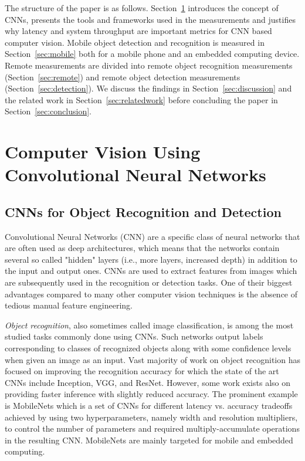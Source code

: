 \documentclass[sigconf]{acmart}
\begin{document}
The structure of the paper is as follows. Section~\ref{sec:background} introduces the concept of CNNs, presents the tools and frameworks used in the measurements and justifies why latency and system throughput are important metrics for CNN based computer vision. Mobile object detection and recognition is measured in Section~\ref{sec:mobile} both for a mobile phone and an embedded computing device. Remote measurements are divided into remote object recognition measurements (Section~\ref{sec:remote}) and remote object detection measurements (Section~\ref{sec:detection}). We discuss the findings in Section~\ref{sec:discussion} and the related work in Section~\ref{sec:relatedwork} before concluding the paper in Section~\ref{sec:conclusion}. %

\section{Computer Vision Using Convolutional Neural Networks}\label{sec:background}\subsection{CNNs for Object Recognition and Detection}

Convolutional Neural Networks (CNN) are a specific class of neural networks that are often used as deep architectures, which means that the networks contain several so called "hidden" layers (i.e., more layers, increased depth) in addition to the input and output ones. 
CNNs are used to extract features from images which are subsequently used in the recognition or detection tasks. One of their biggest advantages compared to many other computer vision techniques is the absence of tedious manual feature engineering.

\textit{Object recognition}, also sometimes called image classification, is among the most studied tasks commonly done using CNNs. Such networks output labels corresponding to classes of recognized objects along with some confidence levels when given an image as an input. Vast majority of work on object recognition has focused on improving the recognition accuracy for which the state of the art CNNs include Inception\cite{Szegedy_2015_CVPR,pmlr-v37-ioffe15,Szegedy_2016_CVPR}, VGG, and ResNet. However, some work exists also on providing faster inference with slightly reduced accuracy. The prominent example is MobileNets\cite{howard17mobilenets} which is a set of CNNs for different latency vs. accuracy tradeoffs achieved by using two hyperparameters, namely width and resolution multipliers, to control the number of parameters and required multiply-accumulate operations in the resulting CNN. MobileNets are mainly targeted for mobile and embedded computing. 
\end{document}
